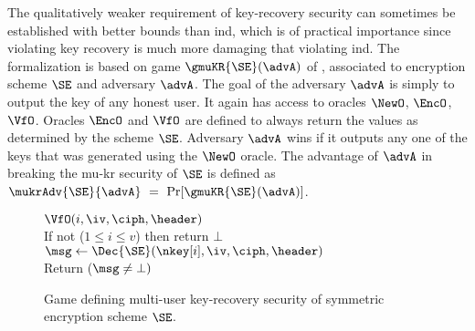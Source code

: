 
The qualitatively weaker requirement of key-recovery security can sometimes be established with better bounds than ind, which is of practical importance since violating key recovery is much more damaging that violating ind. The formalization is based on game $\gmuKR{\SE}(\advA)$ of , associated to encryption scheme $\SE$ and adversary $\advA$.  The goal of the adversary $\advA$ is simply to output the key of any honest user. It again has access to oracles $\NewO$, $\EncO$, $\VfO$. Oracles $\EncO$ and $\VfO$ are defined to always return the values as determined by the scheme $\SE$. Adversary $\advA$ wins if it outputs any one of the keys that was generated using the $\NewO$ oracle. The advantage of $\advA$ in breaking the mu-kr security of $\SE$ is defined as $
	\mukrAdv{\SE}{\advA} \ = \ \Pr[\gmuKR{\SE}(\advA)]$.

\begin{figure} [t]
{
\underline{$\VfO(i,\iv,\ciph,\header)$}\\[2pt]
If not ($1\leq i\leq v$) then return $\bot$ \\
$\msg \gets \Dec{\SE}(\nkey[i],\iv,\ciph,\header)$ \\
Return ($\msg\neq\bot)$ \medskip
}
\vspace{-2ex}
\caption{Game defining multi-user key-recovery security of symmetric encryption scheme $\SE$.}
\label{fig-se-mu-kr}
\hrulefill
\end{figure}
